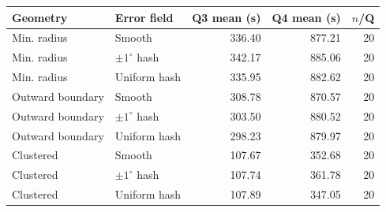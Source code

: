 \begin{tabular}{llrrr}
\toprule
Geometry & Error field & Q3 mean (s) & Q4 mean (s) & $n$/Q \\
\midrule
Min. radius & Smooth & 336.40 & 877.21 & 20 \\
Min. radius & $\pm1^\circ$ hash & 342.17 & 885.06 & 20 \\
Min. radius & Uniform hash & 335.95 & 882.62 & 20 \\
Outward boundary & Smooth & 308.78 & 870.57 & 20 \\
Outward boundary & $\pm1^\circ$ hash & 303.50 & 880.52 & 20 \\
Outward boundary & Uniform hash & 298.23 & 879.97 & 20 \\
Clustered & Smooth & 107.67 & 352.68 & 20 \\
Clustered & $\pm1^\circ$ hash & 107.74 & 361.78 & 20 \\
Clustered & Uniform hash & 107.89 & 347.05 & 20 \\
\bottomrule
\end{tabular}
